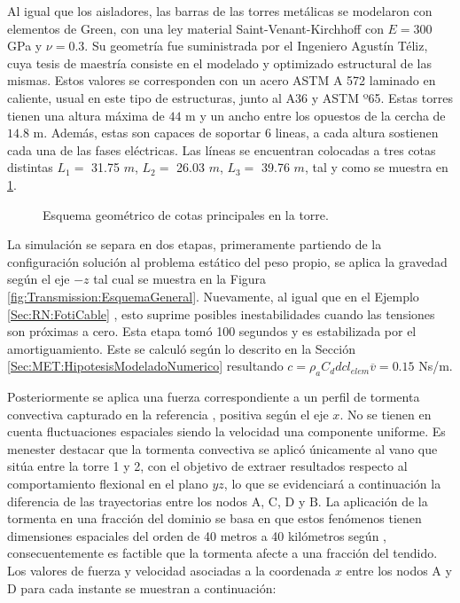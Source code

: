 Al igual que los aisladores, las barras de las torres metálicas se modelaron con elementos de Green, con una ley material Saint-Venant-Kirchhoff con $E= 300$ GPa y $\nu=0.3$. Su geometría fue suministrada por el Ingeniero Agustín Téliz, cuya tesis de maestría consiste en el modelado y optimizado estructural de las mismas.  Estos valores se corresponden con un acero ASTM A 572 laminado en caliente, usual en este tipo de estructuras, junto al A36 y ASTM º65. Estas torres tienen una altura máxima de $44$ m y un ancho entre los opuestos de la cercha de $14.8$ m. Además, estas son capaces de soportar 6 lineas,  a cada altura sostienen cada una de las fases eléctricas. Las líneas se encuentran colocadas a tres cotas distintas $L_1=$ 31.75 $m$, $L_2=$ 26.03 $m$, $L_3=$ 39.76 $m$, tal y como se muestra en \ref{fig:RN:Transmission:Torre}. 

\begin{figure}[h]
	\centering
	\def\svgwidth{80mm}
	
	\caption{Esquema geométrico de cotas principales en la torre. }
	\label{fig:RN:Transmission:Torre}
\end{figure}

La simulación se separa en dos etapas, primeramente partiendo de la configuración solución al problema estático del peso propio, se aplica la gravedad según el eje $-z$ tal cual se muestra en la Figura \ref{fig:Transmission:EsquemaGeneral}. Nuevamente, al igual que en el Ejemplo \ref{Sec:RN:FotiCable} , esto suprime posibles inestabilidades cuando las tensiones son próximas a cero. Esta etapa tomó 100 segundos y es estabilizada por el amortiguamiento. Este se calculó según lo descrito en la Sección \ref{Sec:MET:HipotesisModeladoNumerico} resultando $c=\rho_a C_d dc l_{elem} \overline{v}=0.15$ Ns/m.

Posteriormente se aplica una fuerza correspondiente a un perfil de tormenta convectiva capturado en la referencia \citep{stengel2017measurements}, positiva según el eje $x$. No se tienen en cuenta fluctuaciones espaciales siendo la velocidad una componente uniforme. Es menester destacar que la tormenta convectiva se aplicó únicamente al vano que sitúa entre la torre 1 y 2, con el objetivo de extraer resultados respecto al comportamiento flexional en el plano $yz$, lo que se evidenciará a continuación la diferencia de las trayectorias entre los nodos $\text{A}$, $\text{C}$, $\text{D}$ y $\text{B}$. La aplicación de la tormenta en una fracción del dominio se basa en que estos fenómenos tienen dimensiones espaciales del orden de 40 metros a 40 kilómetros según \cite{fujita1985downburst}, consecuentemente es factible que la tormenta afecte a una fracción del tendido. Los valores de fuerza y velocidad asociadas a la coordenada $x$ entre los nodos A y D para cada instante se muestran a continuación:

